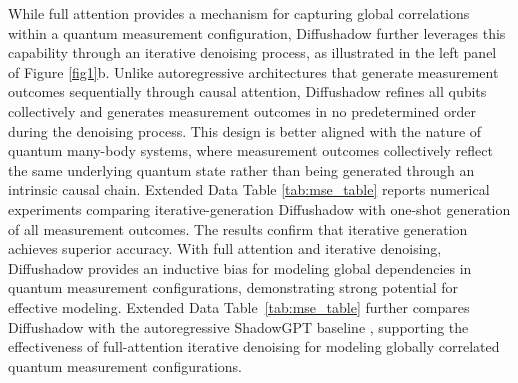 \documentclass[pdflatex,sn-mathphys-num]{sn-jnl}%
\theoremstyle{thmstyleone}%
\theoremstyle{thmstyletwo}%
\theoremstyle{thmstylethree}%
\begin{document}
While full attention provides a mechanism for capturing global correlations within a quantum measurement configuration, Diffushadow further leverages this capability through an iterative denoising process, as illustrated in the left panel of Figure \ref{fig1}b. Unlike autoregressive architectures that generate measurement outcomes sequentially through causal attention, Diffushadow refines all qubits collectively and generates measurement outcomes in no predetermined order during the denoising process. 
This design is better aligned with the nature of quantum many-body systems, where measurement outcomes collectively reflect the same underlying quantum state rather than being generated through an intrinsic causal chain. Extended Data Table \ref{tab:mse_table} reports numerical experiments comparing iterative-generation Diffushadow with one-shot generation of all measurement outcomes. The results confirm that iterative generation achieves superior accuracy.
With full attention and iterative denoising, Diffushadow provides an inductive bias for modeling global dependencies in quantum measurement configurations, demonstrating strong potential for effective modeling. Extended Data Table~\ref{tab:mse_table} further compares Diffushadow with the autoregressive ShadowGPT baseline \cite{yao2024shadowgpt}, supporting the effectiveness of full-attention iterative denoising for modeling globally correlated quantum measurement configurations.

\end{document}
